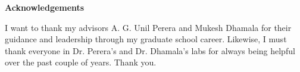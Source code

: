 {}
\begin{doublespace}
  \begin{center}
    \textbf{Acknowledgements}
  \end{center}
  I want to thank my advisors A. G. Unil Perera and Mukesh Dhamala for their guidance and leadership through my graduate school career.  Likewise, I must thank everyone in Dr. Perera's and Dr. Dhamala's labs for always being helpful over the past couple of years.  Thank you.
\end{doublespace}